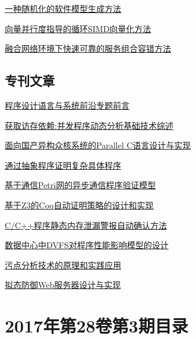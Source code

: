 \documentclass[a4paper]{article}
\begin{document}
\href{http://www.jos.org.cn/ch/reader/create_pdf.aspx?file_no=5055&year_id=2017&quarter_id=4&falg=1}{一种随机化的软件模型生成方法}

\href{http://www.jos.org.cn/ch/reader/create_pdf.aspx?file_no=5029&year_id=2017&quarter_id=4&falg=1}{向量并行度指导的循环SIMD向量化方法}

\href{http://www.jos.org.cn/ch/reader/create_pdf.aspx?file_no=5051&year_id=2017&quarter_id=4&falg=1}{融合网络环境下快速可靠的服务组合容错方法}

\subsection{专刊文章}
\href{http://www.jos.org.cn/ch/reader/create_pdf.aspx?file_no=5198&year_id=2017&quarter_id=4&falg=1}{程序设计语言与系统前沿专题前言}

\href{http://www.jos.org.cn/ch/reader/create_pdf.aspx?file_no=5193&year_id=2017&quarter_id=4&falg=1}{获取访存依赖:并发程序动态分析基础技术综述}

\href{http://www.jos.org.cn/ch/reader/create_pdf.aspx?file_no=5197&year_id=2017&quarter_id=4&falg=1}{面向国产异构众核系统的Parallel C语言设计与实现}

\href{http://www.jos.org.cn/ch/reader/create_pdf.aspx?file_no=5195&year_id=2017&quarter_id=4&falg=1}{通过抽象程序证明复杂具体程序}

\href{http://www.jos.org.cn/ch/reader/create_pdf.aspx?file_no=5191&year_id=2017&quarter_id=4&falg=1}{基于通信Petri网的异步通信程序验证模型}

\href{http://www.jos.org.cn/ch/reader/create_pdf.aspx?file_no=5196&year_id=2017&quarter_id=4&falg=1}{基于Z3的Coq自动证明策略的设计和实现}

\href{http://www.jos.org.cn/ch/reader/create_pdf.aspx?file_no=5189&year_id=2017&quarter_id=4&falg=1}{C/C++程序静态内存泄漏警报自动确认方法}

\href{http://www.jos.org.cn/ch/reader/create_pdf.aspx?file_no=5194&year_id=2017&quarter_id=4&falg=1}{数据中心中DVFS对程序性能影响模型的设计}

\href{http://www.jos.org.cn/ch/reader/create_pdf.aspx?file_no=5190&year_id=2017&quarter_id=4&falg=1}{污点分析技术的原理和实践应用}

\href{http://www.jos.org.cn/ch/reader/create_pdf.aspx?file_no=5192&year_id=2017&quarter_id=4&falg=1}{拟态防御Web服务器设计与实现}


\section{\textbf{2017年第28卷第3期目录}}
\end{document}

